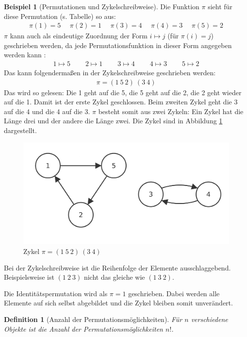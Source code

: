 \documentclass[12pt,a4paper, usenames, dvipsnames]{article}
\theoremstyle{mystyle}
\newtheorem{definition}{Definition}
\theoremstyle{definition}
\newtheorem{bsp}{Beispiel}[definition]
\begin{document}
\begin{bsp}[Permutationen und Zykelschreibweise]
Die Funktion $\pi$ sieht für diese Permutation (s. Tabelle) so aus:
\begin{align*}
\pi(1) = 5 \ \ \ \ \ \  \pi(2) = 1 \ \ \ \ \ \ \pi(3) = 4 \ \ \ \ \ \ \pi(4) = 3 \ \ \ \ \ \ \pi(5) = 2 
\end{align*}
$\pi$ kann auch als eindeutige Zuordnung der Form $i \mapsto j$ (für $\pi(i)=j$) geschrieben werden, da jede Permutationsfunktion in dieser Form angegeben werden kann \cite{JC}:
\begin{align*}
1 \mapsto 5 \ \ \ \ \ \ \ \ \ \  2\mapsto 1 \ \ \ \ \ \ \ \ \ \ 3\mapsto 4 \ \ \ \ \ \ \ \ \ \ 4\mapsto 3 \ \ \ \ \ \ \ \ \ \ 5\mapsto 2 
\end{align*}
Das kann folgendermaßen in der Zykelschreibweise geschrieben werden:
\begin{align*}
\pi = (1 \ 5 \ 2)\ (3 \ 4)
\end{align*}
Das wird so gelesen: Die 1 geht auf die 5, die 5 geht auf die 2, die 2 geht wieder auf die 1. Damit ist der erste Zykel geschlossen. Beim zweiten Zykel geht die 3 auf die 4 und die 4 auf die 3. $\pi$ besteht somit aus zwei Zykeln: Ein Zykel hat die Länge drei und der andere die Länge zwei. Die Zykel sind in Abbildung \ref{Abbildung_ZykelVonf} dargestellt.
\begin{figure}[H]
\centering
\includegraphics[scale=0.13]{Zykel_152.png}
\caption{Zykel $\pi = (1 \ 5 \ 2)\ (3 \ 4)$}
\label{Abbildung_ZykelVonf}
\end{figure}
Bei der Zykelschreibweise ist die Reihenfolge der Elemente ausschlaggebend. Beispielsweise ist $(1 \ 2 \ 3)$ nicht das gleiche wie $(1 \ 3 \ 2)$. 

Die Identitätspermutation wird als $\pi = 1$ geschrieben. Dabei werden alle Elemente auf sich selbst abgebildet und die Zykel bleiben somit unverändert.
\end{bsp}

\begin{definition}[Anzahl der Permutationsmöglichkeiten]
Für $n$ verschiedene Objekte ist die Anzahl der Permutationsmöglichkeiten $n!$.
\end{definition}
\end{document}
